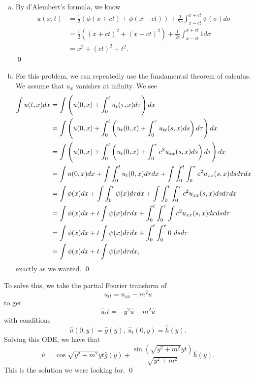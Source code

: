 \documentclass{article}
\begin{document}
\begin{enumerate}[(a)]
    \item By d'Alembert's formula, we know 
    \begin{align*}
        u(x,t) &= \frac{1}{2}(\phi(x+ct)+\phi(x-ct)) + \frac{1}{2c}\int_{x-ct}^{x+ct} \psi(\sigma) d \sigma\\
        &= \frac{1}{2}((x+ct)^2+(x-ct)^2) + \frac{1}{2c}\int_{x-ct}^{x+ct} 1 d \sigma\\
        &= x^2 + (ct)^2 + t^2.
    \end{align*}
    \qed
    \item For this problem, we can repeatedly use the fundamental theorem of calculus. We assume that $u_x$ vanishes at infinity. We see 
    \begin{align*}
        \int u(t,x) dx &= \int \del{u(0,x) + \int_0^t u_t(\tau, x)d\tau} dx \\
        &= \int \del{u(0,x) + \int_0^t \del{u_t(0, x) +\int_0^\tau u_{tt}(s,x)ds}d\tau} dx\\
        &= \int \del{u(0,x) + \int_0^t \del{u_t(0, x) +\int_0^\tau c^2u_{xx}(s,x)ds}d\tau} dx\\
        &= \int u(0,x) dx  +\int \int_0^t u_t(0, x) d\tau dx+\int \int_0^t \int_0^\tau c^2u_{xx}(s,x)dsd\tau dx\\
        &= \int \phi(x) dx  +\int \int_0^t \psi(x) d\tau dx+\int \int_0^t \int_0^\tau c^2u_{xx}(s,x)dsd\tau dx\\
        &= \int \phi(x) dx  +t\int \psi(x) d\tau dx+ \int_0^t \int_0^\tau \int c^2u_{xx}(s,x) dx dsd\tau \\
        &= \int \phi(x) dx  +t\int \psi(x) d\tau dx+ \int_0^t \int_0^\tau 0\  dsd\tau \\
        &= \int \phi(x) dx  +t\int \psi(x) d\tau dx,
    \end{align*}
    exactly as we wanted. \qed
\end{enumerate}


\newpage
{} 
 \tri
\hop 
\solution
To solve this, we take the partial Fourier transform of 
\[u_{tt} = u_{xx} - m^2u\]
to get 
\[\hat{u}_tt = -y^2 \hat{u} - m^2 \hat{u}\]
with conditions 
\[\hat{u}(0,y) = \hat{g}(y), \ \hat{u}_t(0,y) = \hat{h}(y).\]
Solving this ODE, we have that 
\[\hat{u} = \cos{\sqrt{y^2 + m^2}yt}\hat{g}(y) + \frac{\sin(\sqrt{y^2+m^2}yt)}{\sqrt{y^2+m^2}}\hat{h}(y).\]
This is the solution we were looking for. \qed
\end{document}
